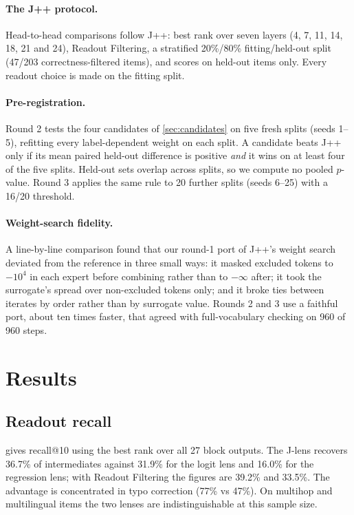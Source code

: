 \documentclass[11pt]{article}
\theoremstyle{definition}
\begin{document}
\paragraph{The J++ protocol.} Head-to-head comparisons follow J++: best rank over seven layers
(4, 7, 11, 14, 18, 21 and 24), Readout Filtering, a stratified 20\%/80\% fitting/held-out split
(47/203 correctness-filtered items), and scores on held-out items only. Every readout choice is made
on the fitting split.

\paragraph{Pre-registration.} Round 2 tests the four candidates of \cref{sec:candidates} on five fresh
splits (seeds 1--5), refitting every label-dependent weight on each split. A candidate beats J++ only
if its mean paired held-out difference is positive \emph{and} it wins on at least four of the five
splits. Held-out sets overlap across splits, so we compute no pooled $p$-value. Round 3 applies the same
rule to 20 further splits (seeds 6--25) with a 16/20 threshold.

\paragraph{Weight-search fidelity.} A line-by-line comparison found that our round-1 port of J++'s
weight search deviated from the reference in three small ways: it masked excluded tokens to $-10^4$
in each expert before combining rather than to $-\infty$ after; it took the surrogate's spread over
non-excluded tokens only; and it broke ties between iterates by order rather than by surrogate value.
Rounds 2 and 3 use a faithful port, about ten times faster, that agreed with full-vocabulary checking
on 960 of 960 steps.

\section{Results}

\subsection{Readout recall}
\label{sec:readout}

 gives recall@10 using the best rank over all 27 block outputs. The J-lens recovers
36.7\% of intermediates against 31.9\% for the logit lens and 16.0\% for the regression lens; with
Readout Filtering the figures are 39.2\% and 33.5\%. The advantage is concentrated in typo
correction (77\% vs 47\%). On multihop and multilingual items the two lenses are indistinguishable at
this sample size.
\end{document}
